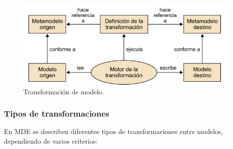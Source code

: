 \begin{figure}[!h] 
	\begin{center}
		\includegraphics [scale=0.50]{imagenes/Transformacion_modelo.png}
	\end{center}
	\caption{Transformación de modelo.}
	\label{fig:Transformación de modelo}
\end{figure} 

\subsubsection*{Tipos de transformaciones}
\label{Tipos de transformaciones}

En MDE se describen diferentes tipos de transformaciones entre modelos, dependiendo de varios criterios:

